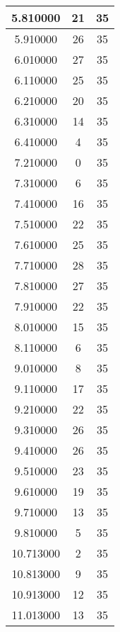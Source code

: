 \begin{longtable}[htbp]{|c|c|c|}
5.810000 & 21 & 35 \\ \hline
5.910000 & 26 & 35 \\ \hline
6.010000 & 27 & 35 \\ \hline
6.110000 & 25 & 35 \\ \hline
6.210000 & 20 & 35 \\ \hline
6.310000 & 14 & 35 \\ \hline
6.410000 & 4 & 35 \\ \hline
7.210000 & 0 & 35 \\ \hline
7.310000 & 6 & 35 \\ \hline
7.410000 & 16 & 35 \\ \hline
7.510000 & 22 & 35 \\ \hline
7.610000 & 25 & 35 \\ \hline
7.710000 & 28 & 35 \\ \hline
7.810000 & 27 & 35 \\ \hline
7.910000 & 22 & 35 \\ \hline
8.010000 & 15 & 35 \\ \hline
8.110000 & 6 & 35 \\ \hline
9.010000 & 8 & 35 \\ \hline
9.110000 & 17 & 35 \\ \hline
9.210000 & 22 & 35 \\ \hline
9.310000 & 26 & 35 \\ \hline
9.410000 & 26 & 35 \\ \hline
9.510000 & 23 & 35 \\ \hline
9.610000 & 19 & 35 \\ \hline
9.710000 & 13 & 35 \\ \hline
9.810000 & 5 & 35 \\ \hline
10.713000 & 2 & 35 \\ \hline
10.813000 & 9 & 35 \\ \hline
10.913000 & 12 & 35 \\ \hline
11.013000 & 13 & 35 \\ \hline
\end{longtable}
